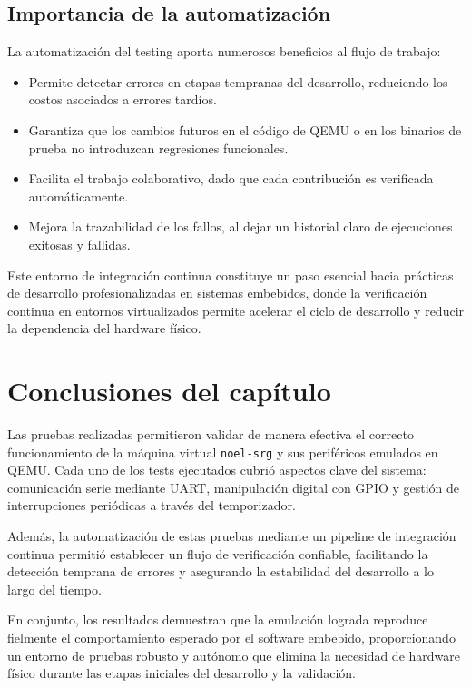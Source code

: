 
\subsection*{Importancia de la automatización}

La automatización del testing aporta numerosos beneficios al flujo de trabajo:

\begin{itemize}
    \item Permite detectar errores en etapas tempranas del desarrollo, reduciendo los costos asociados a errores tardíos.
    \item Garantiza que los cambios futuros en el código de QEMU o en los binarios de prueba no introduzcan regresiones funcionales.
    \item Facilita el trabajo colaborativo, dado que cada contribución es verificada automáticamente.
    \item Mejora la trazabilidad de los fallos, al dejar un historial claro de ejecuciones exitosas y fallidas.
\end{itemize}

\vspace{1em}
Este entorno de integración continua constituye un paso esencial hacia prácticas de desarrollo profesionalizadas en sistemas embebidos, donde la verificación continua en entornos virtualizados permite acelerar el ciclo de desarrollo y reducir la dependencia del hardware físico.

\section{Conclusiones del capítulo}

Las pruebas realizadas permitieron validar de manera efectiva el correcto funcionamiento de la máquina virtual \texttt{noel-srg} y sus periféricos emulados en QEMU. Cada uno de los tests ejecutados cubrió aspectos clave del sistema: comunicación serie mediante UART, manipulación digital con GPIO y gestión de interrupciones periódicas a través del temporizador.

Además, la automatización de estas pruebas mediante un pipeline de integración continua permitió establecer un flujo de verificación confiable, facilitando la detección temprana de errores y asegurando la estabilidad del desarrollo a lo largo del tiempo.

En conjunto, los resultados demuestran que la emulación lograda reproduce fielmente el comportamiento esperado por el software embebido, proporcionando un entorno de pruebas robusto y autónomo que elimina la necesidad de hardware físico durante las etapas iniciales del desarrollo y la validación.


